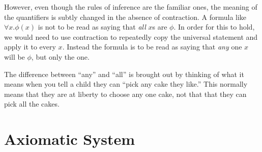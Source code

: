 However, even though the rules of inference are the familiar
ones, the meaning of the quantifiers is subtly changed in the absence
of contraction.  A formula like $\forall x. \phi(x)$ is not to be read as
saying that {\em all} $x$s are $\phi$.  In order for this to hold, we would
need to use contraction to repeatedly copy the universal statement and apply
it to every $x$.  Instead the formula is to be read as saying that {\em any}
one $x$ will be $\phi$, but only the one.  

The difference between ``any'' and
``all'' is brought out by thinking of what it means when you tell a child
they can ``pick any cake they like.''  This normally means that they are
at liberty to choose any one cake, not that that they can pick all the cakes.


\section{Axiomatic System}

